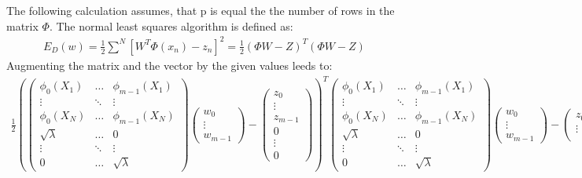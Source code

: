 \documentclass[11pt]{article}
\newcommand{\exercise}{\section{}}
\begin{document}
\exercise

The following calculation assumes, that p is equal the the number of rows in the matrix \textbf{$\Phi$}. The normal least squares algorithm is defined as:
\begin{align}
	E_D(w) = \frac{1}{2} \sum^{N}[W^T\Phi(x_n)-z_n]^2= \frac{1}{2}(\textbf{$\Phi$}W-Z)^T(\textbf{$\Phi$}W-Z)
\end{align}
Augmenting the matrix and the vector by the given values leeds to:
\begin{align}
		\frac{1}{2} (
		\begin{pmatrix}
		\phi_0(X_1) & \dots & \phi_{m-1}(X_1) \\
		\vdots & \ddots & \vdots \\
		\phi_0(X_N) & \dots & \phi_{m-1}(X_N) \\
		\sqrt{\lambda} & \dots & 0 \\
		\vdots & \ddots & \vdots \\
		0 & \dots & \sqrt{\lambda}		
		\end{pmatrix}
		\begin{pmatrix}
		w_0 \\
		\vdots \\
		w_{m-1}
		\end{pmatrix}
		-
		\begin{pmatrix}
		z_0 \\
		\vdots \\
		z_{m-1} \\
		0 \\
		\vdots \\
		0
		\end{pmatrix} )^T
				\begin{pmatrix}
				\phi_0(X_1) & \dots & \phi_{m-1}(X_1) \\
				\vdots & \ddots & \vdots \\
				\phi_0(X_N) & \dots & \phi_{m-1}(X_N) \\
				\sqrt{\lambda} & \dots & 0 \\
				\vdots & \ddots & \vdots \\
				0 & \dots & \sqrt{\lambda}		
				\end{pmatrix}
				\begin{pmatrix}
				w_0 \\
				\vdots \\
				w_{m-1}
				\end{pmatrix}
				-
				\begin{pmatrix}
				z_0 \\
				\vdots \\

\end{pmatrix}
\end{align}
\end{document}
